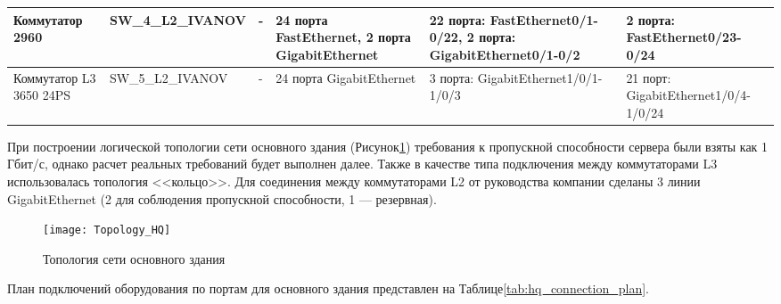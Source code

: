 \documentclass[14pt, a4paper]{extarticle}
\begin{document}
\begin{landscape}
\begin{table}[H]
\begin{tabulary}{\linewidth}{|L|L|L|L|L|L|}
    Коммутатор 2960         & SW\allowbreak\_4\allowbreak\_L2\allowbreak\_IVANOV & -                 & 24 порта FastEthernet, 2 порта GigabitEthernet  & 22 порта: FastEthernet0/1-0/22, 2 порта: GigabitEthernet0/1-0/2  & 2 порта: FastEthernet0/23-0/24 \\ \hline
    Коммутатор L3 3650 24PS & SW\allowbreak\_5\allowbreak\_L2\allowbreak\_IVANOV & -                 & 24 порта GigabitEthernet                        & 3 порта: GigabitEthernet1/0/1-1/0/3                              & 21 порт: GigabitEthernet1/0/4-1/0/24 \\ \hline
  \end{tabulary}
\end{table}
\end{landscape}\pagestyle{plain}\newpage

При построении логической топологии сети основного здания
(Рисунок\;\ref{fig:hq_topology}) требования к пропускной способности
сервера были взяты как 1 Гбит/с, однако расчет реальных требований
будет выполнен далее. Также в качестве типа подключения между
коммутаторами L3 использовалась топология <<кольцо>>. Для соединения между коммутаторами L2 от руководства компании сделаны 3 линии GigabitEthernet (2 для соблюдения пропускной способности, 1 --- резервная).
\begin{figure}[H]
  \centering
  \texttt{[image: Topology\_HQ]}
  \caption{Топология сети основного здания}
  \label{fig:hq_topology}
\end{figure}

План подключений оборудования по портам для основного здания
представлен на Таблице\;\ref{tab:hq_connection_plan}.
\end{document}

